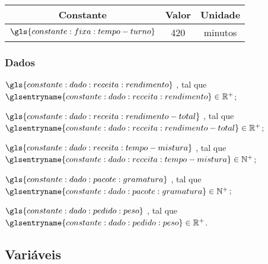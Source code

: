 \begin{quadro}
    \caption{%
        \label{qua:constantes-fixas}%
        Constantes do problema.
    }

    \begin{tabular}{|c|c|c|}
        \hline
        Constante                              &
        Valor                                  &
        Unidade
        \\
        \hline
        \( \gls{constante:fixa:tempo-turno} \) &
        420                                    &
        minutos
        \\
        \hline
    \end{tabular}

    \ComponenteFontePropria{}
\end{quadro}

\subsubsection{Dados}

\begin{symbols}
    \item[\( \gls{constante:dado:receita:rendimento} \)]
    ,
    tal que \( \glsentryname{constante:dado:receita:rendimento} \in \mathbb{R}^{+} \);

    \item[\( \gls{constante:dado:receita:rendimento-total} \)]
    ,
    tal que \( \glsentryname{constante:dado:receita:rendimento-total} \in \mathbb{R}^{+} \);

    \item[\( \gls{constante:dado:receita:tempo-mistura} \)]
    ,
    tal que \( \glsentryname{constante:dado:receita:tempo-mistura} \in \mathbb{N}^{+} \);

    \item[\( \gls{constante:dado:pacote:gramatura} \)]
    ,
    tal que \( \glsentryname{constante:dado:pacote:gramatura} \in \mathbb{N}^{+} \);

    \item[\( \gls{constante:dado:pedido:peso} \)]
    ,
    tal que \( \glsentryname{constante:dado:pedido:peso} \in \mathbb{R}^{+} \).
\end{symbols}

\subsection{Variáveis}

